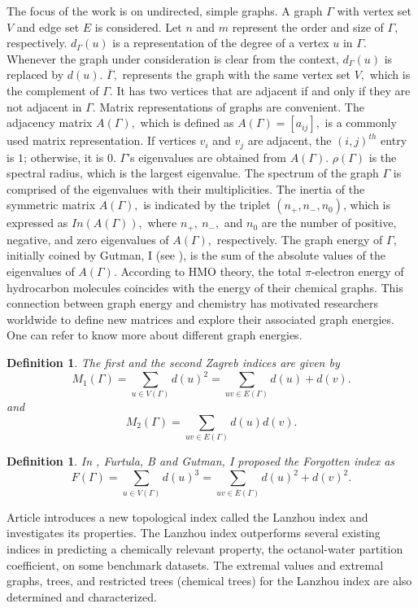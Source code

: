 \documentclass[10pt,a4paper,oneside]{article}
\newtheorem{definition}[theorem]{Definition}
\begin{document}
The focus of the work is on undirected, simple graphs. A graph $\Gamma$ with vertex set $V$ and edge set $E$ is considered. Let $n$ and $m$ represent the order and size of $\Gamma,$ respectively.  $d_\Gamma(u)$ is a representation of the degree of a vertex $u$ in $\Gamma.$ Whenever the graph under consideration is clear from the context, $d_\Gamma(u)$ is replaced by $d(u).$  $\overline{\Gamma},$ represents the graph with the same vertex set $V,$ which is the complement of $\Gamma.$ It has two vertices that are adjacent if and only if they are not adjacent in $\Gamma.$ Matrix representations of graphs are convenient. The adjacency matrix $A(\Gamma),$ which is defined as $A(\Gamma) = [a_{ij}],$ is a commonly used matrix representation. If vertices $v_i$ and $v_j$ are adjacent, the $(i,j)^{th}$ entry is $1$; otherwise, it is $0.$ $\Gamma$'s eigenvalues are obtained from $A(\Gamma).$  $\rho(\Gamma)$ is the spectral radius, which is the largest eigenvalue. The spectrum of the graph $\Gamma$ is comprised of the eigenvalues with their multiplicities. The inertia of the symmetric matrix $A(\Gamma),$ is indicated by the triplet $(n_+,n_-,n_0)$, which is expressed as $In(A(\Gamma)),$ where $n_+,\ n_-,$ and $n_0$ are the number of positive, negative, and zero eigenvalues of $A(\Gamma),$ respectively. The graph energy of $\Gamma,$ initially coined by Gutman, I (see \cite{555}), is the sum of the absolute values of the eigenvalues of $A(\Gamma).$ According to HMO theory, the total $\pi$-electron energy of hydrocarbon molecules coincides with the energy of their chemical graphs. This connection between graph energy and chemistry has motivated researchers worldwide to define new matrices and explore their associated graph energies. One can refer \cite{8,9,10,11,12,13,14,15,16} to know more about different graph energies.

\begin{definition}
The first and the second Zagreb indices \cite{20} are given by
$$M_1(\Gamma)=\sum\limits_{u \in V(\Gamma)}d(u)^2=\sum\limits_{uv\in E(\Gamma)}d(u)+d(v).$$
and	
$$M_2(\Gamma)=\sum\limits_{uv\in E(\Gamma)}d(u)d(v).$$
\end{definition}
\begin{definition}
In \cite{21}, Furtula, B and Gutman, I proposed the Forgotten index as
$$F(\Gamma)=\sum\limits_{u\in V(\Gamma)}d(u)^3=\sum\limits_{uv\in E(\Gamma)}d(u)^2+d(v)^2.$$	
\end{definition}

Article \cite{1} introduces a new topological index called the Lanzhou index and investigates its properties. The Lanzhou index outperforms several existing indices in predicting a chemically relevant property, the octanol-water partition coefficient, on some benchmark datasets. The extremal values and extremal graphs, trees, and restricted trees (chemical trees) for the Lanzhou index are also determined and characterized.
\end{document}
